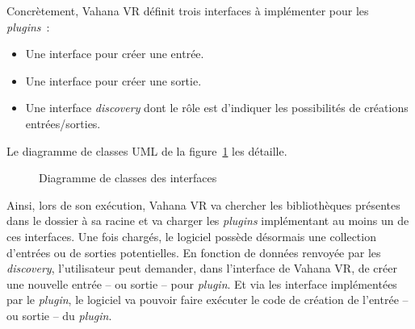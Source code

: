 \newline
Concrètement, Vahana VR définit trois interfaces à implémenter pour les \textit{plugins}~:
\begin{itemize}
  \item Une interface pour créer une entrée.
  \item Une interface pour créer une sortie.
  \item Une interface \textit{discovery} dont le rôle est d'indiquer les possibilités
    de créations entrées/sorties.
\end{itemize}
Le diagramme de classes UML de la figure~\ref{uml-interfaces} les détaille.\\
\begin{figure}
  \centering
  \caption{Diagramme de classes des interfaces}
  \label{uml-interfaces}
\end{figure}
Ainsi, lors de son exécution, Vahana VR va chercher les bibliothèques présentes dans le dossier
 à sa racine et va charger les \textit{plugins} implémentant
au moins un de ces interfaces. Une fois chargés, le logiciel possède désormais une collection d'entrées
ou de sorties potentielles. En fonction de données renvoyée par les \textit{discovery},
l'utilisateur peut demander, dans l'interface de Vahana VR, de 
créer une nouvelle entrée -- ou sortie -- pour \textit{plugin}. Et via les
interface implémentées par le \textit{plugin}, le logiciel va pouvoir faire exécuter le code
de création de l'entrée -- ou sortie -- du \textit{plugin}.\\

